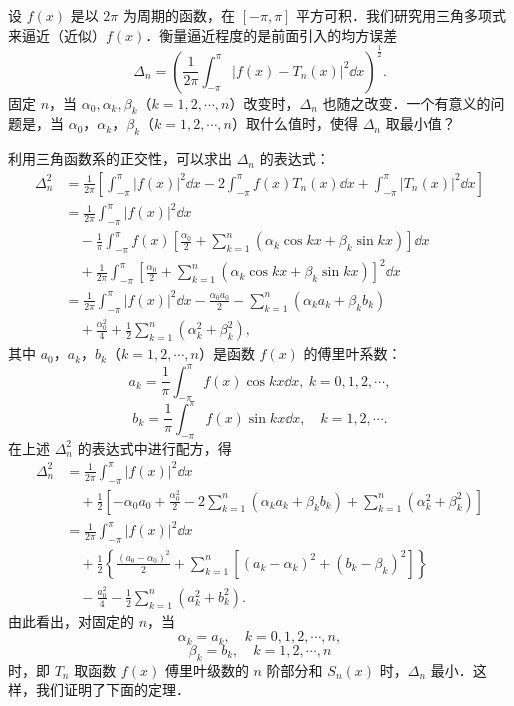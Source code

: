 设 $f(x)$ 是以 $2\pi$ 为周期的函数，在 $[-\pi,\pi]$ 平方可积．我们研究用三角多项式来逼近（近似）$f(x)$．衡量逼近程度的是前面引入的均方误差
\[
\Delta_{n}=\left(\frac{1}{2\pi}\int_{-\pi}^{\pi}\left|f(x)-T_{n}(x)\right|^{2}\dd x\right)^{\frac{1}{2}}.
\]
固定 $n$，当 $\alpha_{0},\alpha_{k},\beta_{k}$（$k=1,2,\cdots,n$）改变时，$\Delta_{n}$ 也随之改变．一个有意义的问题是，当 $\alpha_{0}$，$\alpha_{k}$，$\beta_{k}$（$k=1,2,\cdots,n$）取什么值时，使得 $\Delta_{n}$ 取最小值？

利用三角函数系的正交性，可以求出 $\Delta_{n}$ 的表达式：
\[
\begin{aligned}
\Delta_{n}^{2}&=\frac{1}{2\pi}\left[\int_{-\pi}^{\pi}\left|f(x)\right|^{2}\dd x-2\int_{-\pi}^{\pi}f(x)T_{n}(x)\dd x+\int_{-\pi}^{\pi}\left|T_{n}(x)\right|^{2}\dd x\right]\\
&=\frac{1}{2\pi}\int_{-\pi}^{\pi}\left|f(x)\right|^{2}\dd x\\
&\quad-\frac{1}{\pi}\int_{-\pi}^{\pi}f(x)\left[\frac{\alpha_{0}}{2}+\sum_{k=1}^{n}\left(\alpha_{k}\cos kx+\beta_{k}\sin kx\right)\right]\dd x\\
&\quad+\frac{1}{2\pi}\int_{-\pi}^{\pi}\left[\frac{\alpha_{0}}{2}+\sum_{k=1}^{n}\left(\alpha_{k}\cos kx+\beta_{k}\sin kx\right)\right]^{2}\dd x\\
&=\frac{1}{2\pi}\int_{-\pi}^{\pi}\left|f(x)\right|^{2}\dd x-\frac{\alpha_{0}a_{0}}{2}-\sum_{k=1}^{n}\left(\alpha_{k}a_{k}+\beta_{k}b_{k}\right)\\
&\quad+\frac{\alpha_{0}^{2}}{4}+\frac{1}{2}\sum_{k=1}^{n}\left(\alpha_{k}^{2}+\beta_{k}^{2}\right),
\end{aligned}
\]
其中 $a_{0}$，$a_{k}$，$b_{k}$（$k=1,2,\cdots,n$）是函数 $f(x)$ 的傅里叶系数：
\[
a_{k}=\frac{1}{\pi}\int_{-\pi}^{\pi}f(x)\cos kx\dd x,\ k=0,1,2,\cdots,
\]
\[
b_{k}=\frac{1}{\pi}\int_{-\pi}^{\pi}f(x)\sin kx\dd x,\quad k=1,2,\cdots.
\]
在上述 $\Delta_{n}^{2}$ 的表达式中进行配方，得
\[
\begin{aligned}
\Delta_{n}^{2}&=\frac{1}{2\pi}\int_{-\pi}^{\pi}\left|f(x)\right|^{2}\dd x\\
&\quad+\frac{1}{2}\left[-\alpha_{0}a_{0}+\frac{\alpha_{0}^{2}}{2}-2\sum_{k=1}^{n}\left(\alpha_{k}a_{k}+\beta_{k}b_{k}\right)+\sum_{k=1}^{n}\left(\alpha_{k}^{2}+\beta_{k}^{2}\right)\right]\\
&=\frac{1}{2\pi}\int_{-\pi}^{\pi}\left|f(x)\right|^{2}\dd x\\
&\quad+\frac{1}{2}\left\{\frac{\left(a_{0}-\alpha_{0}\right)^{2}}{2}+\sum_{k=1}^{n}\left[\left(a_{k}-\alpha_{k}\right)^{2}+\left(b_{k}-\beta_{k}\right)^{2}\right]\right\}\\
&\quad-\frac{a_{0}^{2}}{4}-\frac{1}{2}\sum_{k=1}^{n}\left(a_{k}^{2}+b_{k}^{2}\right).
\end{aligned}
\]
由此看出，对固定的 $n$，当
\[
\alpha_{k}=a_{k},\quad k=0,1,2,\cdots,n,
\]
\[
\beta_{k}=b_{k},\quad k=1,2,\cdots,n
\]
时，即 $T_{n}$ 取函数 $f(x)$ 傅里叶级数的 $n$ 阶部分和 $S_{n}(x)$ 时，$\Delta_{n}$ 最小．这样，我们证明了下面的定理．

